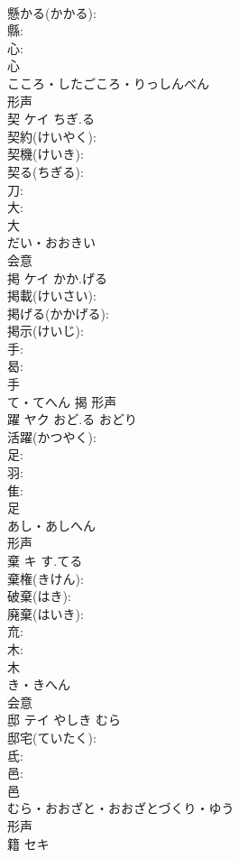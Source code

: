 \documentclass[8pt]{extreport}
\begin{document}
\begin{CJK}{UTF8}{min}
\\	懸かる(かかる): 
\\	縣: 
\\	心: 
\\	心	
\\	こころ・したごころ・りっしんべん	
\\	形声 
\\	契	ケイ	ちぎ.る		
\\	契約(けいやく): 
\\	契機(けいき): 
\\	契る(ちぎる): 
\\	刀: 
\\	大: 
\\	大	
\\	だい・おおきい	
\\	会意 
\\	掲	ケイ	かか.げる		
\\	掲載(けいさい): 
\\	掲げる(かかげる): 
\\	掲示(けいじ): 
\\	手: 
\\	曷: 
\\	手	
\\	て・てへん	揭	形声 
\\	躍	ヤク	おど.る	おどり	
\\	活躍(かつやく): 
\\	足: 
\\	羽: 
\\	隹: 
\\	足	
\\	あし・あしへん	
\\	形声 
\\	棄	キ	す.てる		
\\	棄権(きけん): 
\\	破棄(はき): 
\\	廃棄(はいき): 
\\	㐬: 
\\	木: 
\\	木	
\\	き・きへん	
\\	会意 
\\	邸	テイ	やしき	むら	
\\	邸宅(ていたく): 
\\	氐: 
\\	邑: 
\\	邑	
\\	むら・おおざと・おおざとづくり・ゆう	
\\	形声 
\\	籍	セキ			

\end{CJK}
\end{document}
